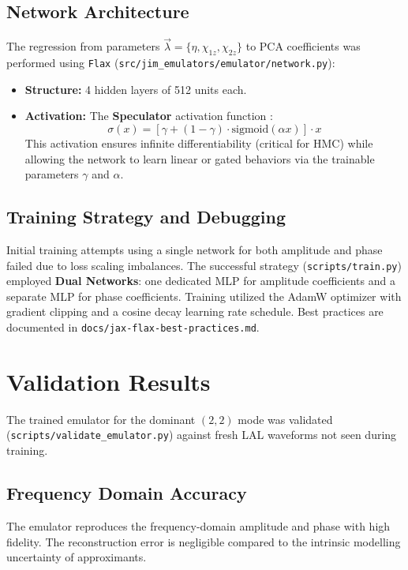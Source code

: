 \documentclass[11pt,a4paper]{article}
\begin{document}
\subsection{Network Architecture}
The regression from parameters $\vec{\lambda} = \{\eta, \chi_{1z}, \chi_{2z}\}$ to PCA coefficients was performed using \texttt{Flax} (\texttt{src/jim\_emulators/emulator/network.py}):
\begin{itemize}
    \item \textbf{Structure:} 4 hidden layers of 512 units each.
    \item \textbf{Activation:} The \textbf{Speculator} activation function \cite{1911.11778}:
    \begin{equation}
        \sigma(x) = [\gamma + (1-\gamma)\cdot\text{sigmoid}(\alpha x)] \cdot x
    \end{equation}
    This activation ensures infinite differentiability (critical for HMC) while allowing the network to learn linear or gated behaviors via the trainable parameters $\gamma$ and $\alpha$.
\end{itemize}

\subsection{Training Strategy and Debugging}
Initial training attempts using a single network for both amplitude and phase failed due to loss scaling imbalances. The successful strategy (\texttt{scripts/train.py}) employed \textbf{Dual Networks}: one dedicated MLP for amplitude coefficients and a separate MLP for phase coefficients. Training utilized the AdamW optimizer with gradient clipping and a cosine decay learning rate schedule. Best practices are documented in \texttt{docs/jax-flax-best-practices.md}.

\section{Validation Results}

The trained emulator for the dominant $(2,2)$ mode was validated (\texttt{scripts/validate\_emulator.py}) against fresh LAL waveforms not seen during training.

\subsection{Frequency Domain Accuracy}
The emulator reproduces the frequency-domain amplitude and phase with high fidelity. The reconstruction error is negligible compared to the intrinsic modelling uncertainty of approximants.
\end{document}
